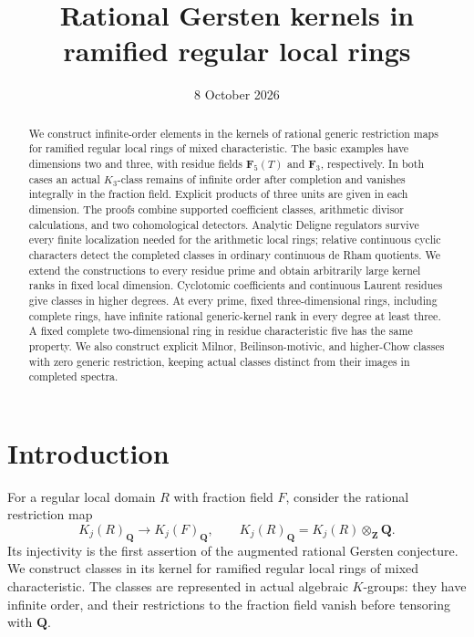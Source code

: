 \documentclass[11pt,a4paper]{amsart}
\title[Rational Gersten kernels]{Rational Gersten kernels in ramified regular local rings}
\date{8 October 2026}
\numberwithin{equation}{section}
\theoremstyle{definition}
\theoremstyle{remark}
\newcommand{\Q}{\mathbf Q}
\newcommand{\Z}{\mathbf Z}
\begin{document}
\begin{abstract}

We construct infinite-order elements in the kernels of rational generic
restriction maps for ramified regular local rings of mixed
characteristic. The basic examples have dimensions two and three,
with residue fields $\mathbf F_5(T)$ and $\mathbf F_3$, respectively.
In both cases an actual $K_3$-class remains of infinite order after
completion and vanishes integrally in the fraction field. Explicit
products of three units are given in each dimension. The proofs combine
supported coefficient classes, arithmetic divisor calculations, and
two cohomological detectors. Analytic Deligne regulators survive every
finite localization needed for the arithmetic local rings; relative
continuous cyclic characters detect the completed classes in ordinary
continuous de Rham quotients. We extend the constructions to every
residue prime and obtain arbitrarily large kernel ranks in fixed local
dimension. Cyclotomic coefficients and continuous Laurent residues give
classes in higher degrees. At every prime, fixed three-dimensional
rings, including complete rings, have infinite rational generic-kernel
rank in every degree at least three. A fixed complete two-dimensional
ring in residue characteristic five has the same property. We also
construct explicit Milnor, Beilinson-motivic, and higher-Chow classes
with zero generic restriction, keeping actual classes distinct from
their images in completed spectra.


\end{abstract}
\maketitle

\setcounter{tocdepth}{1}
\tableofcontents


\section{Introduction}\label{sec:introduction}

For a regular local domain $R$ with fraction field $F$, consider the
rational restriction map
\[
 K_j(R)_{\Q}\longrightarrow K_j(F)_{\Q},
 \qquad K_j(R)_{\Q}=K_j(R)\otimes_{\Z}\Q.
\]
Its injectivity is the first assertion of the augmented rational
Gersten conjecture. We construct classes in its kernel for ramified
regular local rings of mixed characteristic. The classes are represented
in actual algebraic $K$-groups: they have infinite order, and their
restrictions to the fraction field vanish before tensoring with $\Q$.
\end{document}
